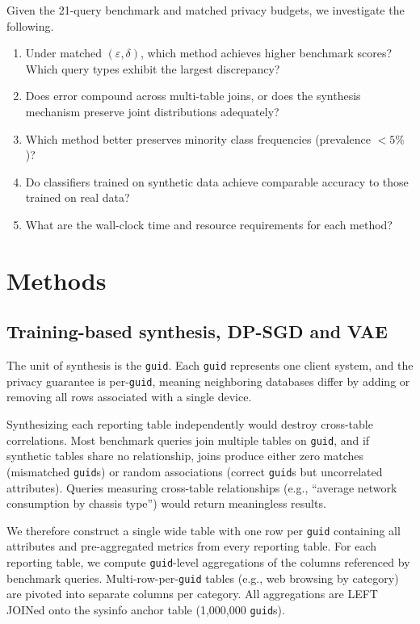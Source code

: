 \documentclass[12pt,letterpaper]{article}
\renewcommand{\_}{\textunderscore\allowbreak}
\begin{document}
Given the 21-query benchmark and matched privacy budgets, we investigate the following.

\begin{enumerate}
    \item Under matched $(\varepsilon, \delta)$, which method achieves higher benchmark scores? Which query types exhibit the largest discrepancy?
    \item Does error compound across multi-table joins, or does the synthesis mechanism preserve joint distributions adequately?
    \item Which method better preserves minority class frequencies (prevalence $< 5\%$)?
    \item Do classifiers trained on synthetic data achieve comparable accuracy to those trained on real data?
    \item What are the wall-clock time and resource requirements for each method?
\end{enumerate}

\newpage

\section{Methods}

\subsection{Training-based synthesis, DP-SGD and VAE}
\label{sec:methods-wide-dpsgd}

The unit of synthesis is the \texttt{guid}. Each \texttt{guid} represents one client system, and the privacy guarantee is per-\texttt{guid}, meaning neighboring databases differ by adding or removing all rows associated with a single device.

Synthesizing each reporting table independently would destroy cross-table correlations. Most benchmark queries join multiple tables on \texttt{guid}, and if synthetic tables share no relationship, joins produce either zero matches (mismatched \texttt{guid}s) or random associations (correct \texttt{guid}s but uncorrelated attributes). Queries measuring cross-table relationships (e.g., ``average network consumption by chassis type'') would return meaningless results.

We therefore construct a single wide table with one row per \texttt{guid} containing all attributes and pre-aggregated metrics from every reporting table. For each reporting table, we compute \texttt{guid}-level aggregations of the columns referenced by benchmark queries. Multi-row-per-\texttt{guid} tables (e.g., web browsing by category) are pivoted into separate columns per category. All aggregations are LEFT JOINed onto the sysinfo anchor table (1{,}000{,}000 \texttt{guid}s).
\end{document}
